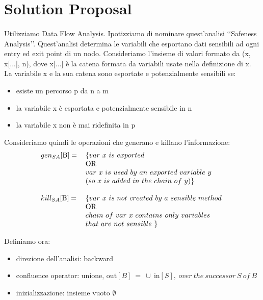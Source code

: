\documentclass[letterpaper,twocolumn,10pt]{article}
\begin{document}
\section{Solution Proposal}
\paragraph{}
Utilizziamo Data Flow Analysis. Ipotizziamo di nominare quest'analisi \lq\lq Safeness Analysis\rq\rq. Quest'analisi determina le variabili che esportano dati sensibili ad ogni entry ed exit point di un nodo. Consideriamo l'insieme di valori formato da (x, x[...], n), dove x[...] \`e la catena formata da variabili usate nella definizione di x. La variabile x e la sua catena sono esportate e potenzialmente sensibili se:
\begin{itemize}
\item esiste un percorso p da n a m
\item la variabile x \`e esportata e potenzialmente sensibile in n
\item la variabile x non \`e mai ridefinita in p
\end{itemize}

Consideriamo quindi le operazioni che generano e killano l'informazione:\\
\begin{align*}
\begin{tabular}{  l l }
	$ gen_{SA}[\text{B}]= $ & $ \{ var\ x\ is\ exported $\\ 
	& OR \\
	& $ var\ x\ is\ used\ by\ an\ exported\ variable\ y\ $\\ 
	& $ ( so\ x\ is\ added\ in\ the\ chain\ of\ y ) \} $ \\
	& \\                  
	$  kill_{SA}[\text{B}]= $ & $ \{ var\ x\ is\ not\ created\ by\ a\ sensible\ method\ $\\
    & OR \\ 
    & $ chain\ of\ var\ x\ contains\ only\ variables\ $ \\
    & $ that\ are\ not\ sensible\ \} $ \\
\end{tabular}
\end{align*}

Definiamo ora: 
\begin{itemize}
\item direzione dell'analisi: backward
\item confluence operator: unione, $ \text{out}[B]\ =\ \cup\ \text{in}[S],\ over\ the\ successor\ S\ of\ B\  $
\item inizializzazione: insieme vuoto $ \emptyset $
\end{itemize}
\end{document}
